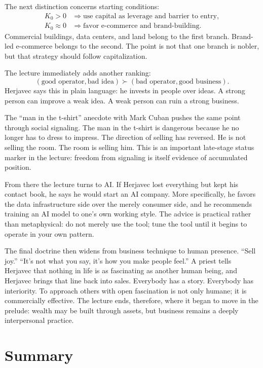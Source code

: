 The next distinction concerns starting conditions:
\begin{align}
K_0 > 0 &\Rightarrow \text{use capital as leverage and barrier to entry},\\
K_0 \approx 0 &\Rightarrow \text{favor e-commerce and brand-building}.
\end{align}
Commercial buildings, data centers, and land belong to the first branch. Brand-led e-commerce belongs to the second. The point is not that one branch is nobler, but that strategy should follow capitalization.

The lecture immediately adds another ranking:
\begin{equation}
(\text{good operator},\text{bad idea})
\succ
(\text{bad operator},\text{good business}).
\end{equation}
Herjavec says this in plain language: he invests in people over ideas. A strong person can improve a weak idea. A weak person can ruin a strong business.

The ``man in the t-shirt'' anecdote with Mark Cuban pushes the same point through social signaling. The man in the t-shirt is dangerous because he no longer has to dress to impress. The direction of selling has reversed. He is not selling the room. The room is selling him. This is an important late-stage status marker in the lecture: freedom from signaling is itself evidence of accumulated position.

From there the lecture turns to AI. If Herjavec lost everything but kept his contact book, he says he would start an AI company. More specifically, he favors the data infrastructure side over the merely consumer side, and he recommends training an AI model to one's own working style. The advice is practical rather than metaphysical: do not merely use the tool; tune the tool until it begins to operate in your own pattern.

The final doctrine then widens from business technique to human presence. ``Sell joy.'' ``It's not what you say, it's how you make people feel.'' A priest tells Herjavec that nothing in life is as fascinating as another human being, and Herjavec brings that line back into sales. Everybody has a story. Everybody has interiority. To approach others with open fascination is not only humane; it is commercially effective. The lecture ends, therefore, where it began to move in the prelude: wealth may be built through assets, but business remains a deeply interpersonal practice.

\section{Summary}

